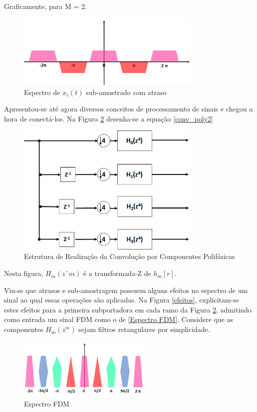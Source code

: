 Graficamente, para M = 2. 

\begin{figure}[h!]
\centering
\includegraphics[width=3.5in]{sub_2_d.png} %
\caption{Espectro de $x_c(t)$ sub-amostrado com atraso}
\label{x_freq_atraso}
\end{figure}

Apresentou-se até agora diversos conceitos de processamento de sinais e chegou a hora de conectá-los. Na Figura \ref{polifase} desenha-se a equação \ref{conv_poly2}

\begin{figure}[h!]
\centering
\includegraphics[width=3.5in]{filt_poli.png} %
\caption{Estrutura de Realização da Convolução por Componentes Polifásicas}
\label{polifase}
\end{figure}

Nesta figura, $H_{m}(zˆm)$ é a transformada-Z de $h_{m}[r]$.  

Viu-se que atrasos e sub-amostragem possuem alguns efeitos no espectro de um sinal ao qual essas operações são aplicadas. 
Na Figura \ref{efeitos}, explicitam-se estes efeitos para a primeira subportadora em cada ramo da Figura \ref{polifase}, admitindo como  entrada um sinal FDM como o de \ref{Espectro FDM}. Considere que as componentes $H_{m}(z^m)$ sejam filtros retangulares por simplicidade. 

\begin{figure}[h!]
\centering
\includegraphics[width=2.5in]{spec_fdm.png} %
\caption{Espectro FDM}
\label{spec_fdm}
\end{figure}

